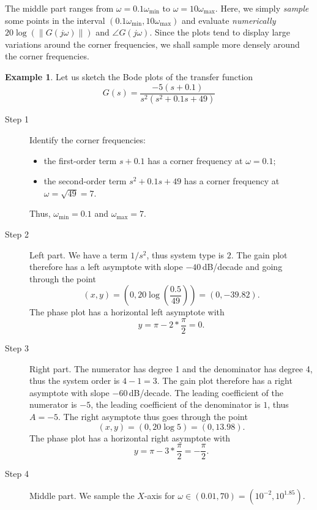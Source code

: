 \documentclass[a4paper,11pt]{report}
\theoremstyle{definition}
\newtheorem{mdexample}{Example}
\newenvironment{example}%
  {\vspace{0.1cm}\begin{mdframed}[backgroundcolor=lightgray]\begin{mdexample}}%
  {\end{mdexample}\end{mdframed}\vspace{0.1cm}}
\begin{document}
The middle part ranges from $\omega=0.1\omega_{\min}$ to
$\omega=10\omega_{\max}$. Here, we simply \emph{sample} some points in
the interval $(0.1\omega_{\min},10\omega_{\max})$ and evaluate
\emph{numerically} $20\log(\|G(j\omega)\|)$ and $\angle
G(j\omega)$. Since the plots tend to display large variations around
the corner frequencies, we shall sample more densely around the corner
frequencies.

\begin{example}
  \label{ex:bode-sketch}
  Let us sketch the Bode plots of the transfer function
  \[
  G(s) = \frac{-5(s+0.1)}{s^2(s^2+0.1s+49)}
  \]

  \begin{description}
  \item[Step 1] Identify the corner frequencies:
    \begin{itemize}
    \item the first-order term $s+0.1$ has a corner frequency at
      $\omega=0.1$;
    \item the second-order term $s^2+0.1s+49$ has a corner frequency at
      $\omega=\sqrt{49}=7$. 
    \end{itemize}
    Thus, $\omega_{\min}=0.1$ and $\omega_{\max}=7$.
  \item[Step 2] Left part. We have a term $1/s^2$, thus system type is
    $2$. The gain plot therefore has a left asymptote with slope
    $-40$\,dB/decade and going through the point
    \[
    (x,y)=\left(0,20\log\left(\frac{0.5}{49}\right)\right)=(0,-39.82).
    \]
    The phase plot has a horizontal left asymptote with 
    \[
    y=\pi-2*\frac{\pi}{2}= 0.
    \]
  \item[Step 3] Right part. The numerator has degree 1 and the
    denominator has degree 4, thus the system order is $4-1=3$. The
    gain plot therefore has a right asymptote with slope
    $-60$\,dB/decade. The leading coefficient of the numerator is
    $-5$, the leading coefficient of the denominator is $1$, thus
    $A=-5$. The right asymptote thus goes through the point
    \[
    (x,y)=(0,20\log 5)=(0,13.98).
    \]
    The phase plot has a horizontal right asymptote with 
    \[
    y=\pi-3*\frac{\pi}{2}= -\frac{\pi}{2}.
    \]
  \item[Step 4] Middle part. We sample the $X$-axis for
    $\omega\in(0.01,70)=(10^{-2},10^{1.85})$.
    

\end{description}
\end{example}
\end{document}
